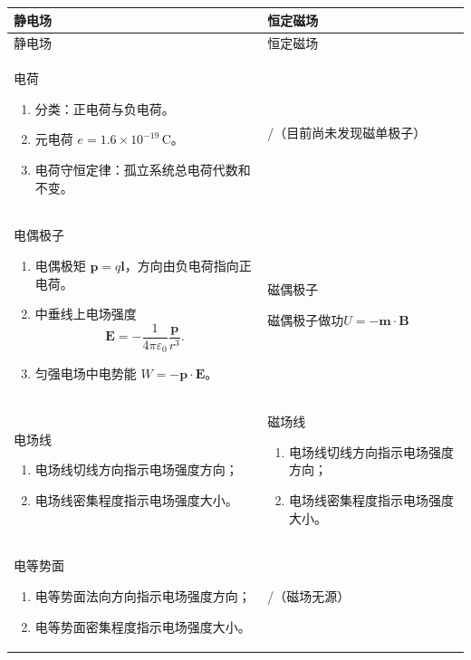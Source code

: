 \documentclass[UTF8,fontset=fandol,zihao=5]{ctexart}
\newcommand{\vect}[1]{\bm{#1}}
\begin{document}
\begingroup
\small
\renewcommand{\arraystretch}{1.15}
\setlength{\tabcolsep}{6pt}
\begin{longtable}{|>{\raggedright\arraybackslash}p{}|>{\raggedright\arraybackslash}p{}|}
\hline
\centering 静电场 & \centering\arraybackslash 恒定磁场\\ \hline
\endfirsthead
\hline
\centering 静电场 & \centering\arraybackslash 恒定磁场\\ \hline
\endhead

\centering 电荷
\begin{enumerate}
  \item 分类：正电荷与负电荷。
  \item 元电荷 \(e=1.6\times10^{-19}\,\mathrm C\)。
  \item 电荷守恒定律：孤立系统总电荷代数和不变。
\end{enumerate}
& \centering\arraybackslash /（目前尚未发现磁单极子）\\ \hline

\centering 电偶极子
\begin{enumerate}
  \item 电偶极矩 \(\vect p=q\vect l\)，方向由负电荷指向正电荷。
  \item 中垂线上电场强度
  \[
    \vect E=-\frac{1}{4\pi\varepsilon_0}\frac{\vect p}{r^3}.
  \]
  \item 匀强电场中电势能 \(W=-\vect p\cdot\vect E\)。
\end{enumerate}
& \centering\arraybackslash 磁偶极子\par
磁偶极子做功$U=- \vect m \cdot \vect B$ \\
\hline

\centering 电场线
\begin{enumerate}
  \item 电场线切线方向指示电场强度方向；
  \item 电场线密集程度指示电场强度大小。
\end{enumerate}
& \centering\arraybackslash 磁场线
\begin{enumerate}
  \item 电场线切线方向指示电场强度方向；
  \item 电场线密集程度指示电场强度大小。
\end{enumerate}
\\ \hline

\centering 电等势面
\begin{enumerate}
  \item 电等势面法向方向指示电场强度方向；
  \item 电等势面密集程度指示电场强度大小。
\end{enumerate}
& \centering\arraybackslash /（磁场无源）\\ \hline


\end{longtable}
\end{document}
